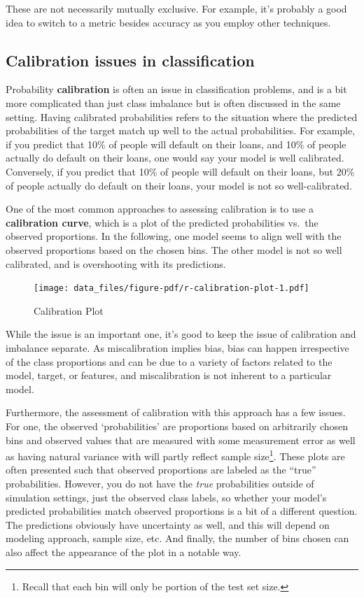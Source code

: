 \documentclass[
  letterpaper,
]{krantz}
\begin{document}
These are not necessarily mutually exclusive. For example, it's probably
a good idea to switch to a metric besides accuracy as you employ other
techniques.

\subsection{Calibration issues in
classification}\label{calibration-issues-in-classification}

Probability \textbf{calibration} is often an issue in classification
problems, and is a bit more complicated than just class imbalance but is
often discussed in the same setting. Having calibrated probabilities
refers to the situation where the predicted probabilities of the target
match up well to the actual probabilities. For example, if you predict
that 10\% of people will default on their loans, and 10\% of people
actually do default on their loans, one would say your model is well
calibrated. Conversely, if you predict that 10\% of people will default
on their loans, but 20\% of people actually do default on their loans,
your model is not so well-calibrated.

One of the most common approaches to assessing calibration is to use a
\textbf{calibration curve}, which is a plot of the predicted
probabilities vs.~the observed proportions. In the following, one model
seems to align well with the observed proportions based on the chosen
bins. The other model is not so well calibrated, and is overshooting
with its predictions.

\begin{figure}

{\centering \texttt{[image: data\_files/figure-pdf/r-calibration-plot-1.pdf]}

}

\caption{Calibration Plot}

\end{figure}

While the issue is an important one, it's good to keep the issue of
calibration and imbalance separate. As miscalibration implies bias, bias
can happen irrespective of the class proportions and can be due to a
variety of factors related to the model, target, or features, and
miscalibration is not inherent to a particular model.

Furthermore, the assessment of calibration with this approach has a few
issues. For one, the observed `probabilities' are proportions based on
arbitrarily chosen bins and observed values that are measured with some
measurement error as well as having natural variance with will partly
reflect sample size\footnote{Recall that each bin will only be portion
  of the test set size.}. These plots are often presented such that
observed proportions are labeled as the ``true'' probabilities. However,
you do not have the \emph{true} probabilities outside of simulation
settings, just the observed class labels, so whether your model's
predicted probabilities match observed proportions is a bit of a
different question. The predictions obviously have uncertainty as well,
and this will depend on modeling approach, sample size, etc. And
finally, the number of bins chosen can also affect the appearance of the
plot in a notable way.
\end{document}
